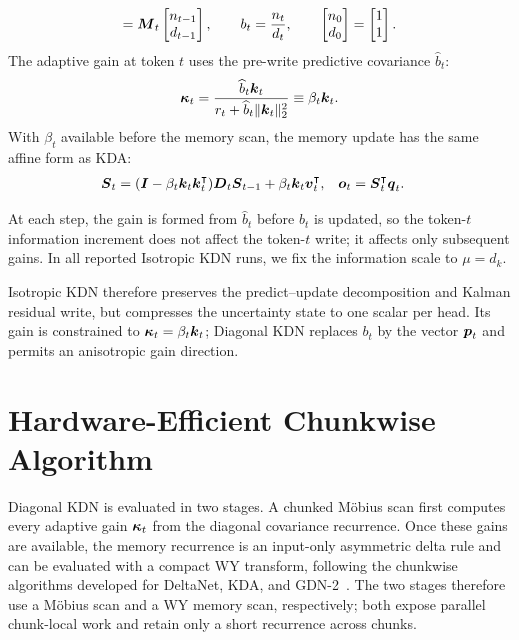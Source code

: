 \documentclass[11pt,letterpaper,logo]{yalearxiv}
\begin{document}
\begin{tcolorbox}
\begin{equation}
  =
  \boldsymbol{M}_t
  \begin{bmatrix}n_{t-1}\\ d_{t-1}\end{bmatrix},
  \qquad
  b_t=\frac{n_t}{d_t},
  \qquad
  \begin{bmatrix}n_0\\ d_0\end{bmatrix}
  =
  \begin{bmatrix}1\\ 1\end{bmatrix}.
  \label{eq:iso-kla-box-mobius}
\end{equation}
The adaptive gain at token $t$ uses the pre-write predictive covariance $\widehat b_t$:
\begin{equation}
  \boldsymbol{\kappa}_t
  =\frac{\widehat b_t\boldsymbol{k}_t}
    {r_t+\widehat b_t\|\boldsymbol{k}_t\|_2^2}
  \equiv\beta_t\boldsymbol{k}_t.
\label{eq:iso-kla-box-gain}
\end{equation}
With $\beta_t$ available before the memory scan, the memory update has the same affine form as KDA:
\begin{equation}
\begin{aligned}
  \boldsymbol{S}_t
  &=(\boldsymbol{I}-\beta_t\boldsymbol{k}_t\boldsymbol{k}_t^{\intercal})\boldsymbol{D}_t\boldsymbol{S}_{t-1}
    +\beta_t\boldsymbol{k}_t\boldsymbol{v}_t^{\intercal},
  &
  \boldsymbol{o}_t &= \boldsymbol{S}_t^{\intercal}\boldsymbol{q}_t .
\end{aligned}
  \label{eq:iso-kla-box-memory}
\end{equation}
\end{tcolorbox}

At each step, the gain is formed from $\widehat b_t$ before $b_t$ is updated, so the token-$t$
information increment does not affect the token-$t$ write; it affects only subsequent gains.
In all reported Isotropic KDN runs, we fix the information scale to $\mu=d_k$.

Isotropic KDN therefore preserves the predict--update decomposition and Kalman residual write, but
compresses the uncertainty state to one scalar per head. Its gain is constrained to
$\boldsymbol{\kappa}_t=\beta_t\boldsymbol{k}_t$; Diagonal KDN replaces $b_t$ by the vector $\boldsymbol{p}_t$ and permits
an anisotropic gain direction.

\section{Hardware-Efficient Chunkwise Algorithm}
\label{sec:chunkwise-algorithm}

Diagonal KDN is evaluated in two stages. A chunked M\"obius scan first computes every adaptive
gain $\boldsymbol{\kappa}_t$ from the diagonal covariance recurrence. Once these gains are available,
the memory recurrence is an input-only asymmetric delta rule and can be evaluated with a compact
WY transform, following the chunkwise algorithms developed for DeltaNet, KDA, and
GDN-2~\citep{yang2024parallelizing,kimiteam2025kimilinear,hatamizadeh2026gdn2}. The two stages
therefore use a M\"obius scan and a WY memory scan, respectively; both expose parallel
chunk-local work and retain only a short recurrence across chunks.
\end{document}
